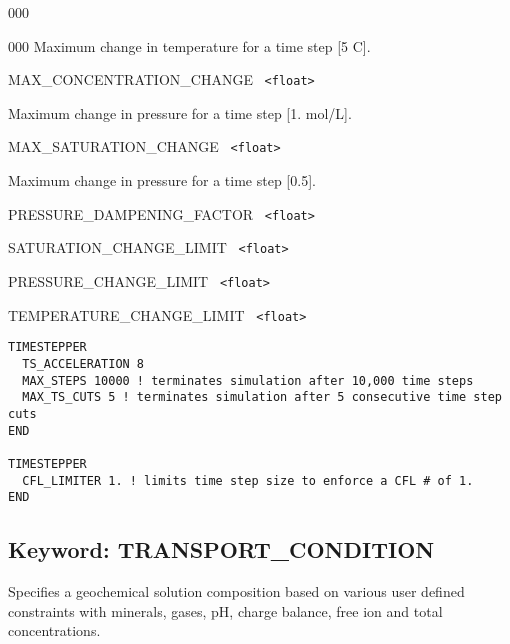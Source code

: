 \begin{deflist}{000}
\begin{deflist}{000}
Maximum change in temperature for a time step [5 C].

\item[MAX\_CONCENTRATION\_CHANGE] \ {\tt <float>} 

Maximum change in pressure for a time step [1. mol/L].

\item[MAX\_SATURATION\_CHANGE] \ {\tt <float>} 

Maximum change in pressure for a time step [0.5].

\item[PRESSURE\_DAMPENING\_FACTOR] \ {\tt <float>}
\item[SATURATION\_CHANGE\_LIMIT] \ {\tt <float>}
\item[PRESSURE\_CHANGE\_LIMIT] \ {\tt <float>}
\item[TEMPERATURE\_CHANGE\_LIMIT] \ {\tt <float>}
\end{deflist}
\item[\keyend]
\end{deflist}



\begin{mdframed}
\footnotesize
\begin{Verbatim}
TIMESTEPPER
  TS_ACCELERATION 8
  MAX_STEPS 10000 ! terminates simulation after 10,000 time steps
  MAX_TS_CUTS 5 ! terminates simulation after 5 consecutive time step cuts
END

TIMESTEPPER
  CFL_LIMITER 1. ! limits time step size to enforce a CFL # of 1.
END
\end{Verbatim}
\normalsize
\end{mdframed}

\hyperlink{target_key}{\return}


\newpage
\protect\hypertarget{target_trans_cond}{}

\subsection{Keyword: TRANSPORT\_CONDITION}

 Specifies a geochemical solution composition based on various user defined constraints with minerals, gases, pH, charge balance, free ion and total concentrations.

